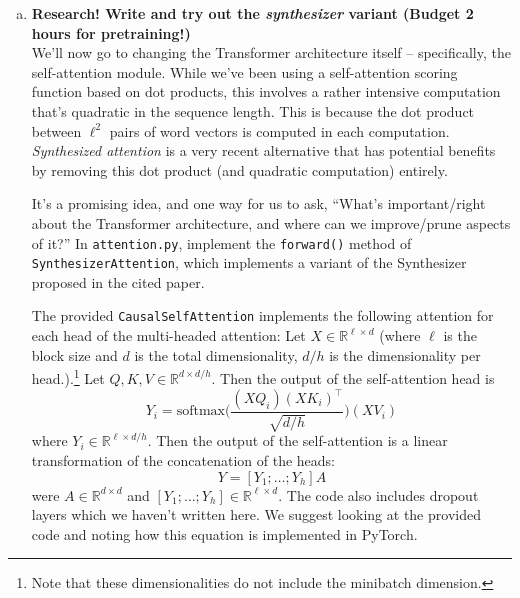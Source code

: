 \begin{enumerate}[(a)]


\pagebreak %

\item {} \textbf{Research! Write and try out the \textit{synthesizer} variant (Budget 2 hours for pretraining!)}\\
We'll now go to changing the Transformer architecture itself -- specifically, the self-attention module.
While we've been using a self-attention scoring function based on dot products, this involves a rather intensive computation that's quadratic in the sequence length. This is because the dot product between $\ell^2$ pairs of word vectors is computed in each computation.
\textit{Synthesized attention} \cite{tay2020synthesizer} is a very recent alternative that has potential benefits by removing this dot product (and quadratic computation) entirely.

It's a promising idea, and one way for us to ask, ``What's important/right about the Transformer architecture, and where can we improve/prune aspects of it?''
In \texttt{attention.py}, implement the \texttt{forward()} method of \texttt{SynthesizerAttention}, which implements a variant of the Synthesizer proposed in the cited paper.

The provided \texttt{CausalSelfAttention} implements the following attention for each head of the multi-headed attention:
Let $X\in \mathbb{R}^{\ell \times d}$ (where $\ell$ is the block size and $d$ is the total dimensionality, $d/h$ is the dimensionality per head.).\footnote{Note that these dimensionalities do not include the minibatch dimension.}
Let $Q,K,V \in \mathbb{R}^{d\times d/h}$.
Then the output of the self-attention head is 
\begin{equation} \label{qkv_eqn}
Y_i = \text{softmax}\bigg(\frac{(XQ_i)(XK_i)^\top}{\sqrt{d/h}}\bigg)(XV_i)
\end{equation}
where $Y_i\in\mathbb{R}^{\ell \times d/h}$.
Then the output of the self-attention is a linear transformation of the concatenation of the heads:
\begin{equation}
Y = [Y_1;\dots;Y_h]A
\end{equation}
were $A \in\mathbb{R}^{d\times d}$ and $[Y_1;\dots;Y_h]\in\mathbb{R}^{\ell \times d}$.
The code also includes dropout layers which we haven't written here.
We suggest looking at the provided code and noting how this equation is implemented in PyTorch.


\end{enumerate}
